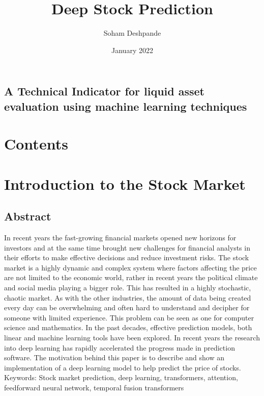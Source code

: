 \documentclass{article}
\title{Deep Stock Prediction}
\author{Soham Deshpande}
\date{January 2022}
\begin{document}
\maketitle
\subsection*{A Technical Indicator for  liquid asset evaluation using machine learning techniques }
\clearpage
\section{Contents}
\clearpage

\section {Introduction to the Stock Market}
\subsection{Abstract}
\normalsize{In recent years the fast-growing financial markets opened new horizons for investors and at the same time brought new challenges for financial analysts in their efforts to make effective decisions and reduce investment risks.
The stock market is a highly dynamic and complex system where factors affecting the price are not limited to the economic world, rather in recent years the political climate and social media playing a bigger role. This has resulted in a highly stochastic, chaotic market. As with the other industries, the amount of data being created every day can be overwhelming and often hard to understand and decipher for someone with limited experience. This problem can be seen as one for computer science and mathematics.
In the past decades, effective prediction models, both linear and machine learning tools have been explored. In recent years the research into deep learning has rapidly accelerated the progress made in prediction software. The motivation behind this paper is to describe and show an implementation of a deep learning model to help predict the price of stocks.
\\
Keywords:
Stock market prediction, deep learning, transformers, attention, feedforward neural network, temporal fusion transformers
}
\end{document}
